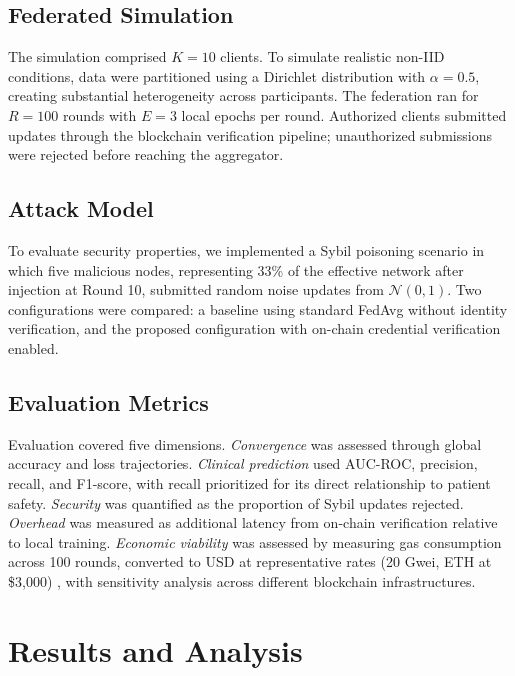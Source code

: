 \documentclass[english]{sbc2025}
\begin{document}
\subsection{Federated Simulation}

The simulation comprised $K=10$ clients. To simulate realistic non-IID conditions, data were partitioned using a Dirichlet distribution with $\alpha=0.5$, creating substantial heterogeneity across participants. The federation ran for $R=100$ rounds with $E=3$ local epochs per round. Authorized clients submitted updates through the blockchain verification pipeline; unauthorized submissions were rejected before reaching the aggregator.

\subsection{Attack Model}

To evaluate security properties, we implemented a Sybil poisoning scenario in which five malicious nodes, representing 33\% of the effective network after injection at Round 10, submitted random noise updates from $\mathcal{N}(0, 1)$. Two configurations were compared: a baseline using standard FedAvg without identity verification, and the proposed configuration with on-chain credential verification enabled.

\subsection{Evaluation Metrics}

Evaluation covered five dimensions. \textit{Convergence} was assessed through global accuracy and loss trajectories. \textit{Clinical prediction} used AUC-ROC, precision, recall, and F1-score, with recall prioritized for its direct relationship to patient safety. \textit{Security} was quantified as the proportion of Sybil updates rejected. \textit{Overhead} was measured as additional latency from on-chain verification relative to local training. \textit{Economic viability} was assessed by measuring gas consumption across 100 rounds, converted to USD at representative rates (20 Gwei, ETH at \$3,000) \citep{coingecko2026}, with sensitivity analysis across different blockchain infrastructures.


\section{Results and Analysis}
\label{sec:results}
\end{document}
